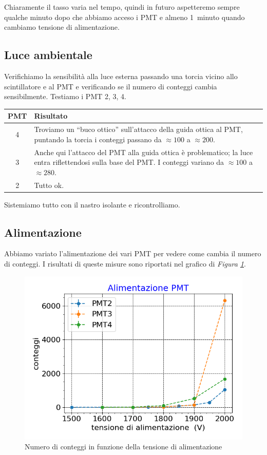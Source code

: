 \documentclass[a4paper]{article}
\begin{document}
Chiaramente il tasso varia nel tempo, quindi in futuro aspetteremo sempre qualche minuto dopo che abbiamo acceso i PMT e almeno 1~minuto quando cambiamo tensione di alimentazione.

\subsection*{Luce ambientale}

Verifichiamo la sensibilità alla luce esterna passando una torcia vicino allo scintillatore e al PMT e verificando se il numero di conteggi cambia sensibilmente.
Testiamo i PMT 2, 3, 4.
\begin{center}
\begin{tabular}{c|p{50ex}}
	PMT & Risultato \\
	\hline
	4 &
	Troviamo un ``buco ottico'' sull'attacco della guida ottica al PMT,
	puntando la torcia i conteggi passano da $\approx 100$ a $\approx 200$. \\
	3 &
	Anche qui l'attacco del PMT alla guida ottica è problematico;
	la luce entra riflettendosi sulla base del PMT.
	I conteggi variano da $\approx 100$ a $\approx 280$.\\
	2 &
	Tutto ok.
\end{tabular}
\end{center}
Sistemiamo tutto con il nastro isolante e ricontrolliamo.



\subsection*{Alimentazione}

Abbiamo variato l'alimentazione dei vari PMT per vedere come cambia il numero di conteggi. I risultati di queste misure sono  riportati nel grafico di \emph{Figura \ref{tensio}}. 

\begin{figure}[h]
\centering
\includegraphics[width=8 cm]{tensio_pmt}
\caption{Numero di conteggi in funzione della tensione di alimentazione}
\label{tensio}
\end{figure}
\end{document}
